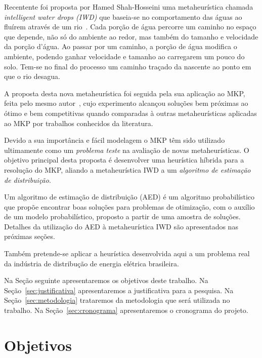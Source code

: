 \documentclass[brazil]{article}
\begin{document}
Recentente foi proposta por Hamed Shah-Hosseini uma metaheurística cha\-ma\-da
\textit{intelligent water drops (IWD)} que baseia-se no comportamento das
águas ao fluírem através de um rio~\cite{Hosseini-2007}.
Cada porção de água percorre um caminho no espaço que depende, não só do
ambiente ao redor, mas também do tamanho e velocidade da porção d'água.
Ao passar por um caminho, a porção de água modifica o ambiente, podendo
ganhar velocidade e tamanho ao carregarem um pouco do solo.
Tem-se no final do processo um caminho traçado da nascente ao ponto em que o rio desagua.

A proposta desta nova metaheurística foi seguida pela sua aplicação ao MKP,
feita pelo mesmo autor~\cite{Hosseini-2008}, cujo experimento alcançou soluções
bem próximas ao ótimo e bem competitivas quando comparadas à ou\-tras metaheurísticas
aplicadas ao MKP por trabalhos conhecidos da literatura.

Devido a sua importância e fácil modelagem o MKP têm sido utilizado ultimamente
como um \textit{problema teste} na avaliação de novas metaheurísticas.
O objetivo principal desta proposta é desenvolver uma heurística híbrida
para a resolução do MKP, aliando a metaheurística IWD a um \textit{algoritmo
de estimação de distribuição}.

Um algoritmo de estimação de distribuição (AED) é um algoritmo probabilístico
que propõe encontrar boas soluções para problemas de otimização, com o auxílio
de um modelo probabilístico, proposto a partir de uma amostra de soluções.
Detalhes da utilização do AED à metaheurística IWD são apresentados nas próximas seções.


Também pretende-se aplicar a heurística desenvolvida aqui a um problema real da
indústria de distribução de energia elétrica brasileira.

Na Seção seguinte apresentaremos os objetivos deste trabalho.
Na Seção~\ref{sec:justificativa} apresentaremos a justificativa para a pesquisa.
Na Seção~\ref{sec:metodologia} trataremos da metodologia que será utilizada no trabalho.
Na Seção~\ref{sec:cronograma} apresentaremos o cronograma do projeto.

\section{Objetivos}
\label{sec:objetivos}
\end{document}
